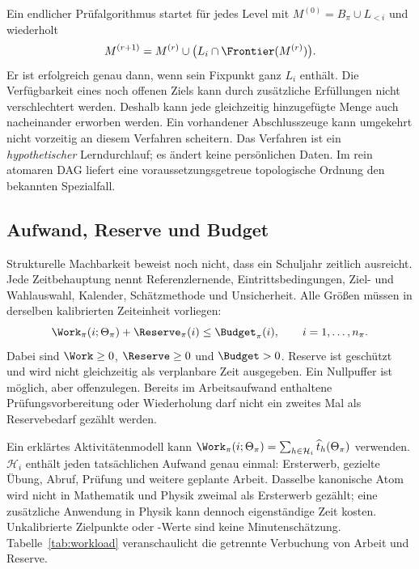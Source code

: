 Ein endlicher Prüfalgorithmus startet für jedes Level mit
$M^{(0)}=B_\pi\cup L_{<i}$ und wiederholt
\begin{equation}
 M^{(r+1)}=M^{(r)}\cup\bigl(L_i\cap\Frontier(M^{(r)})\bigr).
\end{equation}
Er ist erfolgreich genau dann, wenn sein Fixpunkt ganz $L_i$ enthält.
Die Verfügbarkeit eines noch offenen Ziels kann durch zusätzliche
Erfüllungen nicht verschlechtert werden. Deshalb kann jede gleichzeitig
hinzugefügte Menge auch nacheinander erworben werden. Ein vorhandener
Abschlusszeuge kann umgekehrt nicht vorzeitig an diesem Verfahren scheitern.
Das Verfahren ist ein \emph{hypothetischer} Lerndurchlauf; es ändert keine
persönlichen Daten. Im rein atomaren DAG liefert eine voraussetzungsgetreue
topologische Ordnung den bekannten Spezialfall.

\subsection{Aufwand, Reserve und Budget}
Strukturelle Machbarkeit beweist noch nicht, dass ein Schuljahr zeitlich
ausreicht. Jede Zeitbehauptung nennt Referenzlernende, Eintrittsbedingungen,
Ziel- und Wahlauswahl, Kalender, Schätzmethode und Unsicherheit.
Alle Größen müssen in derselben kalibrierten Zeiteinheit vorliegen:
\begin{equation}
 \Work_\pi(i;\Theta_\pi)+\Reserve_\pi(i)\leq \Budget_\pi(i),
 \qquad i=1,\ldots,n_\pi.
 \label{eq:budget}
\end{equation}
Dabei sind $\Work\geq0$, $\Reserve\geq0$ und $\Budget>0$.
Reserve ist geschützt und wird nicht gleichzeitig als verplanbare Zeit
ausgegeben. Ein Nullpuffer ist möglich, aber offenzulegen. Bereits im
Arbeitsaufwand enthaltene Prüfungsvorbereitung oder Wiederholung darf nicht
ein zweites Mal als Reservebedarf gezählt werden.

Ein erklärtes Aktivitätenmodell kann
$\Work_\pi(i;\Theta_\pi)=\sum_{h\in\mathcal H_i}\widehat t_h(\Theta_\pi)$
verwenden. $\mathcal H_i$ enthält jeden tatsächlichen Aufwand genau einmal:
Ersterwerb, gezielte Übung, Abruf, Prüfung und weitere geplante Arbeit.
Dasselbe kanonische Atom wird nicht in Mathematik und Physik zweimal als
Ersterwerb gezählt; eine zusätzliche Anwendung in Physik kann dennoch
eigenständige Zeit kosten. Unkalibrierte \glqq Zielpunkte\grqq{} oder
-Werte sind keine Minutenschätzung.
Tabelle~\ref{tab:workload} veranschaulicht die getrennte Verbuchung von Arbeit und Reserve.


